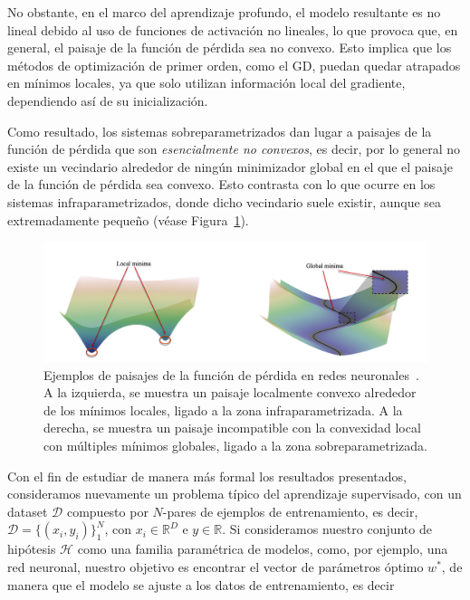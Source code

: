 No obstante, en el marco del aprendizaje profundo, el modelo resultante es no lineal debido al uso de funciones de activación no lineales, lo que provoca que, en general, el paisaje de la función de pérdida sea no convexo. Esto implica que los métodos de optimización de primer orden, como el GD, puedan quedar atrapados en mínimos locales, ya que solo utilizan información local del gradiente, dependiendo así de su inicialización.\newline

Como resultado, los sistemas sobreparametrizados dan lugar a paisajes de la función de pérdida que son \textit{esencialmente no convexos}, es decir, por lo general no existe un vecindario alrededor de ningún minimizador global en el que el paisaje de la función de pérdida sea convexo. Esto contrasta con lo que ocurre en los sistemas infraparametrizados, donde dicho vecindario suele existir, aunque sea extremadamente pequeño (véase Figura~\ref{fig:localglobalminima}).\newline

\begin{figure}[h]
    \centering
    \includegraphics[width=0.8\linewidth]{img/localglobalminima.png}
    \caption[Ejemplos de paisajes de la función de pérdida en redes neuronales~\cite{Liu2021}.]{Ejemplos de paisajes de la función de pérdida en redes neuronales~\cite{Liu2021}. A la izquierda, se muestra un paisaje localmente convexo alrededor de los mínimos locales, ligado a la zona infraparametrizada. A la derecha, se muestra un paisaje incompatible con la convexidad local con múltiples mínimos globales, ligado a la zona sobreparametrizada.}\label{fig:localglobalminima}
\end{figure}

Con el fin de estudiar de manera más formal los resultados presentados, consideramos nuevamente un problema típico del aprendizaje supervisado, con un dataset $\mathcal{D}$ compuesto por $N$-pares de ejemplos de entrenamiento, es decir,  $\mathcal{D} = \{(x_i, y_i)\}_{1}^{N}$, con $x_i \in \mathbb{R}^{D}$ e $y \in \mathbb{R}$. Si consideramos nuestro conjunto de hipótesis $\mathcal{H}$ como una familia paramétrica de modelos, como, por ejemplo, una red neuronal, nuestro objetivo es encontrar el vector de parámetros óptimo $w^{*}$, de manera que el modelo se ajuste a los datos de entrenamiento, es decir

